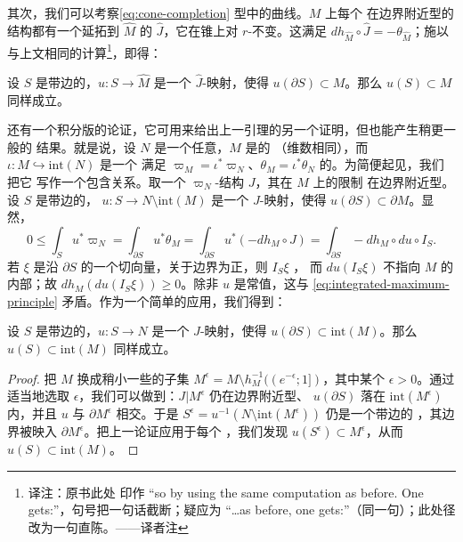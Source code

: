 其次，我们可以考察\eqref{eq:cone-completion} 型\trCompletion{}中的\trPseudoholomorphic{}曲线。$M$ 上每个
在边界附近\trContact{}型的\trAlmostComplex{}结构都有一个延拓到 $\widehat{M}$ 的\trCanonical{}%
$\hat{J}$，它在锥上对 $r$-\trTranslation{}不变。这满足
$dh_{\widehat{M}}\circ\hat{J}=-\theta_{\widehat{M}}$；施以与上文相同的计算\footnote{译注：原书此处
印作 “so by using the same computation as before. One gets:”，句号把一句话截断；疑应为
“…as before, one gets:”（同一句）；此处径改为一句直陈。——译者注}，即得：
\begin{lemma}\label{thm:completion-maximum-principle}
设 $S$ 是带边的\trCompact\trConnected\trRiemann\trSurface，$u\colon S\to\widehat{M}$ 是一个%
$\hat{J}$-\trHolomorphic{}映射，使得 $u(\partial S)\subset M$。那么 $u(S)\subset M$ 同样成立。
\noqed
\end{lemma}
还有一个积分版的\trMaximumPrinciple{}论证，它可用来给出上一引理的另一个证明，但也能产生稍更一般的%
结果。就是说，设 $N$ 是一个任意\trExactSymplectic\trManifold，$M$ 是\trContactTypeBoundary{}的%
\trExactSymplectic\trManifold（维数相同），而 $\iota\colon M\hookrightarrow\mathrm{int}(N)$ 是一个%
满足 $\varpi_M=\iota^*\varpi_N$、$\theta_M=\iota^*\theta_N$ 的\trEmbedding。为简便起见，我们把它
写作一个包含关系。取一个 $\varpi_N$-\trCompatible{}\trAlmostComplex{}结构 $J$，其在 $M$ 上的限制
在边界附近\trContact{}型。设 $S$ 是带边的\trCompact\trConnected\trRiemann\trSurface，
$u\colon S\to N\setminus\mathrm{int}(M)$ 是一个 $J$-\trHolomorphic{}映射，使得
$u(\partial S)\subset\partial M$。显然，
\begin{equation}\label{eq:integrated-maximum-principle}
0\le\int_S u^*\varpi_N=\int_{\partial S}u^*\theta_M=\int_{\partial S}u^*(-dh_M\circ J)
=\int_{\partial S}-dh_M\circ du\circ I_S.
\end{equation}
若 $\xi$ 是沿 $\partial S$ 的一个切向量，关于边界\trOrientation{}为正，则 $I_S\xi$ \trIncoming，
而 $du(I_S\xi)$ 不指向 $M$ 的内部；故 $dh_M(du(I_S\xi))\ge 0$。除非 $u$ 是常值，这与
\eqref{eq:integrated-maximum-principle} 矛盾。作为一个简单的应用，我们得到：
\begin{lemma}\label{thm:relative-maximum-principle}
设 $S$ 是带边的\trCompact\trConnected\trRiemann\trSurface，$u\colon S\to N$ 是一个
$J$-\trHolomorphic{}映射，使得 $u(\partial S)\subset\mathrm{int}(M)$。那么
$u(S)\subset\mathrm{int}(M)$ 同样成立。
\end{lemma}
\begin{proof}
把 $M$ 换成稍小一些的子集 $M^\epsilon=M\setminus h_M^{-1}((e^{-\epsilon};1])$，其中某个
$\epsilon>0$。通过适当地选取 $\epsilon$，我们可以做到：$J|M^\epsilon$ 仍在边界附近\trContact{}型、
$u(\partial S)$ 落在 $\mathrm{int}(M^\epsilon)$ 内，并且 $u$ 与 $\partial M^\epsilon$
\trTransverse{}相交。于是 $S^\epsilon=u^{-1}(N\setminus\mathrm{int}(M^\epsilon))$ 仍是一个带边的%
\trCompact\trRiemann\trSurface，其边界被映入 $\partial M^\epsilon$。把上一论证应用于每个%
\trConnectedComponent，我们发现 $u(S^\epsilon)\subset M^\epsilon$，从而
$u(S)\subset\mathrm{int}(M)$。
\end{proof}
